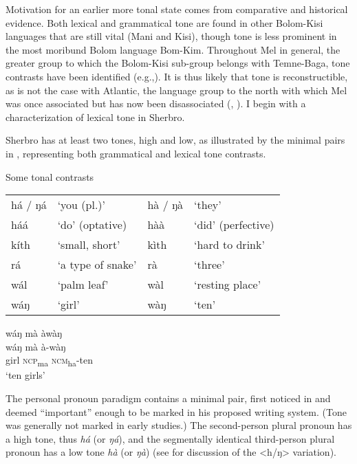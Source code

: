 Motivation for an earlier more tonal state comes from comparative and historical evidence. Both lexical and grammatical tone are found in other Bolom-Kisi languages that are still vital (Mani and Kisi), though tone is less prominent in the most moribund Bolom language Bom-Kim. Throughout Mel in general, the greater group to which the Bolom-Kisi sub-group belongs with Temne-Baga, tone contrasts have been identified (e.g.,\citealt{Wilson1968}). It is thus likely that tone is reconstructible, as is not the case with Atlantic, the language group to the north with which Mel was once associated but has now been disassociated (\citealt{Childs2004}, \citealt{Childs2024a}). I begin with a characterization of lexical tone in Sherbro.

Sherbro has at least two tones, high and low, as illustrated by the minimal pairs in , representing both grammatical and lexical tone contrasts.

\ea%
\label{ex:30}Some tonal contrasts\\
\ea \label{ex:30a}
\begin{tabular}[t]{llll}
há / ŋá\footnotemark & ‘you (pl.)' &hà / ŋà & ‘they'\\
háá & ‘do' (optative) & hàà & ‘did' (perfective)\\
kíth & ‘small, short' & kìth & ‘hard to drink'\\
rá & ‘a type of snake' & rà & ‘three'\\
wál & ‘palm leaf' & wàl & ‘resting place'\\
wáŋ & ‘girl' & wàŋ & ‘ten'\\
\end{tabular}
\vspace{6pt}
\ex wáŋ mà àwàŋ\\
\gll wáŋ mà à-wàŋ\\
girl \textsc{ncp}\textsubscript{ma} \textsc{ncm}\textsubscript{ha}-ten\\
\glt ‘ten girls'
\z
\z

The personal pronoun paradigm contains a minimal pair, first noticed in \citet[13]{Sumner1921} and deemed “important” enough to be marked in his proposed writing system. (Tone was generally not marked in early studies.) The second-person plural pronoun has a high tone, thus \textit{há} (or \textit{ŋá}), and the segmentally identical third-person plural pronoun has a low tone \textit{hà} (or \textit{ŋà}) (see  for discussion of the <h/ŋ> variation).

